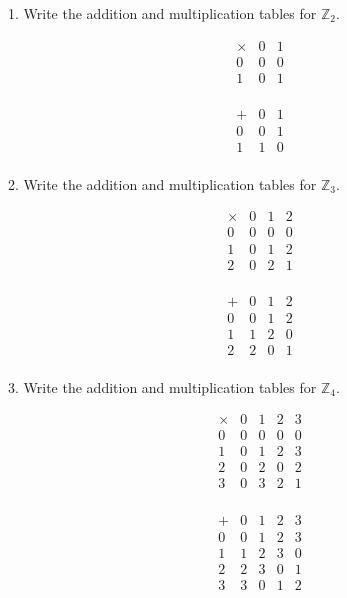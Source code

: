 \documentclass{idrisMemo}
\begin{document}
\toc
\thispagestyle{styleTOC}
\pagebreak
\pagestyle{styleE}

\begin{prooflist}{1. Write the addition and multiplication tables for $\mathbb{Z}_2$.}
\item
    \[
\begin{array}{c|cc}
\times & 0 & 1 \\
\hline
0 & 0 & 0 \\
1 & 0 & 1 \\
\end{array}
\]
\item
    \[
\begin{array}{c|cc}
+ & 0 & 1 \\
\hline
0 & 0 & 1 \\
1 & 1 & 0 \\
\end{array}
\]
\end{prooflist}

\begin{prooflist}{2. Write the addition and multiplication tables for $\mathbb{Z}_3$.}
\item \[
\begin{array}{c|ccc}
\times & 0 & 1 & 2 \\
\hline
0 & 0 & 0 & 0 \\
1 & 0 & 1 & 2 \\
2 & 0 & 2 & 1 \\
\end{array}
\]
\item \[
\begin{array}{c|ccc}
+ & 0 & 1 & 2 \\
\hline
0 & 0 & 1 & 2 \\
1 & 1 & 2 & 0 \\
2 & 2 & 0 & 1 \\
\end{array}
\]
\end{prooflist}

\begin{prooflist}{3. Write the addition and multiplication tables for $\mathbb{Z}_4$.}
\item \[
\begin{array}{c|cccc}
\times & 0 & 1 & 2 & 3 \\
\hline
0 & 0 & 0 & 0 & 0 \\
1 & 0 & 1 & 2 & 3 \\
2 & 0 & 2 & 0 & 2 \\
3 & 0 & 3 & 2 & 1 \\
\end{array} \]
\item \[
\begin{array}{c|cccc}
+ & 0 & 1 & 2 & 3 \\
\hline
0 & 0 & 1 & 2 & 3 \\
1 & 1 & 2 & 3 & 0 \\
2 & 2 & 3 & 0 & 1 \\
3 & 3 & 0 & 1 & 2 \\
\end{array} \]

\end{prooflist}
\end{document}
